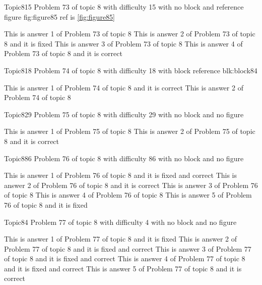 \documentclass[master]{exam}
\begin{document}
\begin{problem}{Topic8}{15}
	Problem 73 of topic 8 with difficulty 15 with no block and reference figure fig:figure85 ref is \ref{fig:figure85}
	\begin{answers}
		\answer This is answer 1 of Problem 73 of topic 8 
		\answer[fixed] This is answer 2 of Problem 73 of topic 8 and it is fixed
		\answer This is answer 3 of Problem 73 of topic 8 
		\answer[correct] This is answer 4 of Problem 73 of topic 8 and it is correct
	\end{answers}
\end{problem}

\begin{problem}[requires=blk:block84]{Topic8}{18}
	Problem 74 of topic 8 with difficulty 18 with block reference blk:block84
	\begin{answers}
		\answer[correct] This is answer 1 of Problem 74 of topic 8 and it is correct
		\answer This is answer 2 of Problem 74 of topic 8 
	\end{answers}
\end{problem}

\begin{problem}{Topic8}{29}
	Problem 75 of topic 8 with difficulty 29 with no block and no figure
	\begin{answers}
		\answer This is answer 1 of Problem 75 of topic 8 
		\answer[correct] This is answer 2 of Problem 75 of topic 8 and it is correct
	\end{answers}
\end{problem}

\begin{problem}{Topic8}{86}
	Problem 76 of topic 8 with difficulty 86 with no block and no figure
	\begin{answers}
		 This is answer 1 of Problem 76 of topic 8 and it is fixed and correct
		\answer[correct] This is answer 2 of Problem 76 of topic 8 and it is correct
		\answer This is answer 3 of Problem 76 of topic 8 
		\answer This is answer 4 of Problem 76 of topic 8 
		\answer[fixed] This is answer 5 of Problem 76 of topic 8 and it is fixed
	\end{answers}
\end{problem}

\begin{problem}{Topic8}{4}
	Problem 77 of topic 8 with difficulty 4 with no block and no figure
	\begin{answers}
		\answer[fixed] This is answer 1 of Problem 77 of topic 8 and it is fixed
		 This is answer 2 of Problem 77 of topic 8 and it is fixed and correct
		 This is answer 3 of Problem 77 of topic 8 and it is fixed and correct
		 This is answer 4 of Problem 77 of topic 8 and it is fixed and correct
		\answer[correct] This is answer 5 of Problem 77 of topic 8 and it is correct
	\end{answers}
\end{problem}
\end{document}
